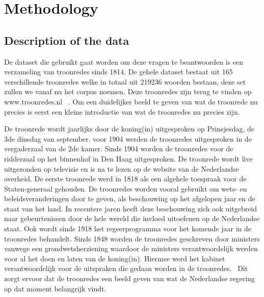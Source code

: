 \section{Methodology}
\label{sec:meth}


\subsection{Description of the data}
De dataset die gebruikt gaat worden om deze vragen te beantwoorden is een verzameling van troonredes sinds 1814. De gehele dataset bestaat uit 165 verschillende troonredes welke in totaal uit 219236 woorden bestaan, deze set zullen we vanaf nu het corpus noemen. Deze troonredes zijn terug te vinden op www.troonredes.nl~\citep{troonredes} . Om een duidelijker beeld te geven van wat de troonrede nu precies is eerst een kleine introductie van wat de troonredes nu precies zijn. 

De troonrede wordt jaarlijks door de koning(in) uitgesproken op Prinsjesdag, de 3de dinsdag van september. voor 1904 werden de troonredes uitgesproken in de vergaderzaal van de 2de kamer. Sinds 1904 worden de troonredes voor de ridderzaal op het binnenhof in Den Haag uitgesproken. De troonrede wordt live uitgezonden op televisie en is na te lezen op de website van de Nederlandse overheid. De eerste troonrede werd in 1818 als een algehele toespraak voor de Staten-generaal gehouden. De troonredes worden vooral gebruikt om wets- en beleidsveranderingen door te geven, als beschouwing op het afgelopen jaar en de staat van het land. In recentere jaren heeft deze beschouwing zich ook uitgebreid naar gebeurtenissen door de hele wereld die invloed uitoefenen op de Nederlandse staat. Ook wordt sinds 1918 het regeerprogramma voor het komende jaar in de troonredes behandelt. Sinds 1848 worden de troonredes geschreven door ministers vanwege een grondwetsherziening waardoor de ministers verantwoordelijk werden voor al het doen en laten van de koning(in). Hiermee werd het kabinet verantwoordelijk voor de uitspraken die gedaan worden in de troonredes.~\citep{overheid} Dit zorgt ervoor dat de troonredes een beeld geven van wat de Nederlandse regering op dat moment belangrijk vindt.

